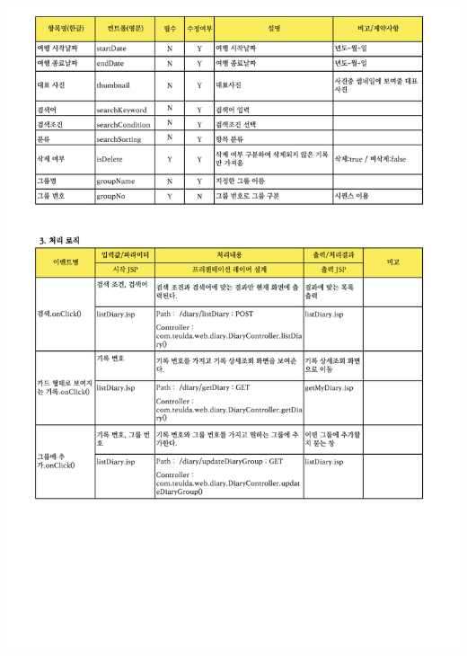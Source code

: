 {{{{{{{{{{{{{{{{{{{{{{{{{{{{{{{{{{\includegraphics[width=20cm]{./Figure/Design/Display/diary/diary_16.pdf} \\
}}}}}}}}}}}}}}}}}}}}}}}}}}}}}}}}}}
